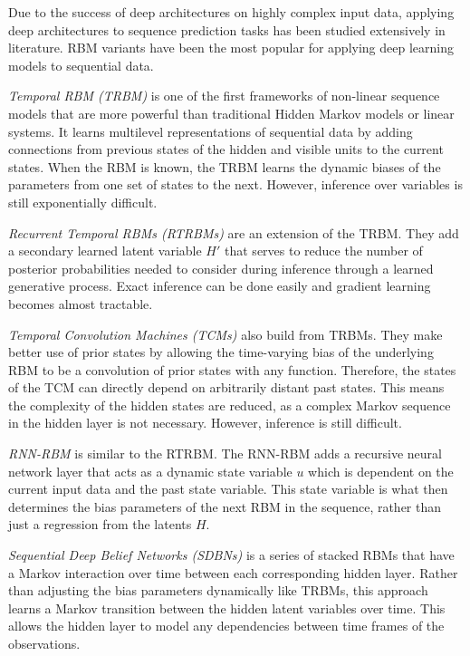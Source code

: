 Due to the success of deep architectures on highly complex input data, applying deep architectures to sequence prediction tasks has been studied extensively in literature. RBM variants have been the most popular for applying deep learning models to sequential data.

\emph{Temporal RBM (TRBM)} \cite{sutskever06} is one of the first frameworks of non-linear sequence models that are more powerful than traditional Hidden Markov models or linear systems. It learns multilevel representations of sequential data by adding connections from previous states of the hidden and visible units to the current states. When the RBM is known, the TRBM learns the dynamic biases of the parameters from one set of states to the next. However, inference over variables is still exponentially difficult.


\emph{Recurrent Temporal RBMs (RTRBMs)} \cite{sutskever08} are an extension of the TRBM. They add a secondary learned latent variable \(H'\) that serves to reduce the number of posterior probabilities needed to consider during inference through a learned generative process. Exact inference can be done easily and gradient learning becomes almost tractable.


\emph{Temporal Convolution Machines (TCMs)} \cite{lockett09} also build from TRBMs. They make better use of prior states by allowing the time-varying bias of the underlying RBM to be a convolution of prior states with any function. Therefore, the states of the TCM can directly depend on arbitrarily distant past states. This means the complexity of the hidden states are reduced, as a complex Markov sequence in the hidden layer is not necessary. However, inference is still difficult.


\emph{RNN-RBM} \cite{lewandowski12} is similar to the RTRBM. The RNN-RBM adds a recursive neural network layer that acts as a dynamic state variable \(u\) which is dependent on the current input data and the past state variable. This state variable is what then determines the bias parameters of the next RBM in the sequence, rather than just a regression from the latents \(H\).


\emph{Sequential Deep Belief Networks (SDBNs)} \cite{andrew12, andrew13}  is a series of stacked RBMs that have a Markov interaction over time between each corresponding hidden layer. Rather than adjusting the bias parameters dynamically like TRBMs, this approach learns a Markov transition between the hidden latent variables over time. This allows the hidden layer to model any dependencies between time frames of the observations.


